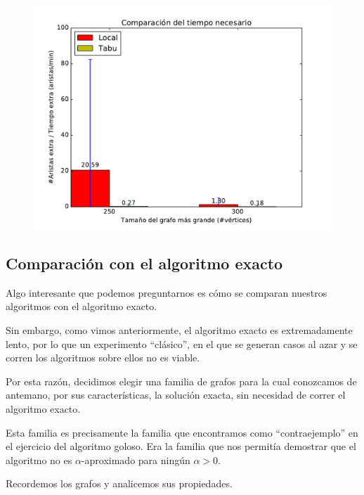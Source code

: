 \begin{figure}[H]
\begin{minipage}{0.49\textwidth}
  \centering
    \includegraphics[width=1\textwidth]{graficos/problema_7/cociente4.pdf}
  \caption{}
  \label{fig:7-cociente3}
\end{minipage}%
\end{figure}

\subsection{Comparación con el algoritmo exacto}

Algo interesante que podemos preguntarnos es cómo se comparan nuestros algoritmos con el algoritmo exacto.

Sin embargo, como vimos anteriormente, el algoritmo exacto es extremadamente lento, por lo que un experimento ``clásico'', en el que se generan casos al azar y se corren los algoritmos sobre ellos no es viable.

Por esta razón, decidimos elegir una familia de grafos para la cual conozcamos de antemano, por sus características, la solución exacta, sin necesidad de correr el algoritmo exacto. 

Esta familia es precisamente la familia que encontramos como ``contraejemplo'' en el ejercicio del algoritmo goloso. Era la familia que nos permitía demostrar que el algoritmo no es $\alpha$-aproximado para ningún $\alpha > 0$. 

Recordemos los grafos y analicemos sus propiedades.


